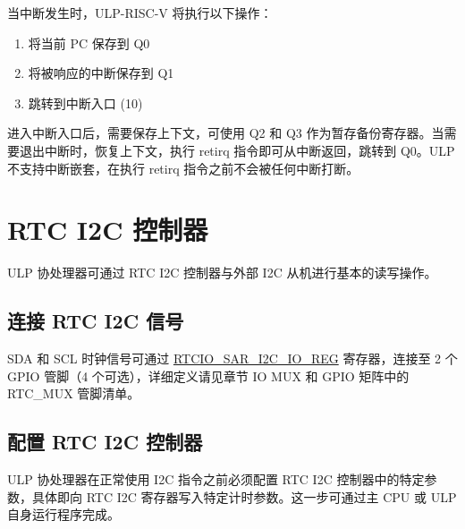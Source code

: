 \documentclass[main\_\_CN.tex]{subfiles}
\begin{document}
当中断发生时，ULP-RISC-V 将执行以下操作：

\begin{enumerate}
    \item 将当前 PC 保存到 Q0
    \item 将被响应的中断保存到 Q1
    \item 跳转到中断入口 (\hexprefix{}10)
\end{enumerate}

进入中断入口后，需要保存上下文，可使用 Q2 和 Q3 作为暂存备份寄存器。当需要退出中断时，恢复上下文，执行 retirq 指令即可从中断返回，跳转到 Q0。ULP 不支持中断嵌套，在执行 retirq 指令之前不会被任何中断打断。

\section{RTC I2C 控制器} \label{subsection:RTC_I2C-Controller}

ULP 协处理器可通过 RTC I2C 控制器与外部 I2C 从机进行基本的读写操作。

\subsection{连接 RTC I2C 信号}

SDA 和 SCL 时钟信号可通过 \hyperref[regdesc:RTCIOSARI2CIOREG]{RTCIO\_SAR\_I2C\_IO\_REG} 寄存器，连接至 2 个 GPIO 管脚（4 个可选），详细定义请见章节 IO MUX 和 GPIO 矩阵中的 RTC\_MUX 管脚清单。

\subsection{配置 RTC I2C 控制器}

ULP 协处理器在正常使用 I2C 指令之前必须配置 RTC I2C 控制器中的特定参数，具体即向 RTC I2C 寄存器写入特定计时参数。这一步可通过主 CPU 或 ULP 自身运行程序完成。
\end{document}

